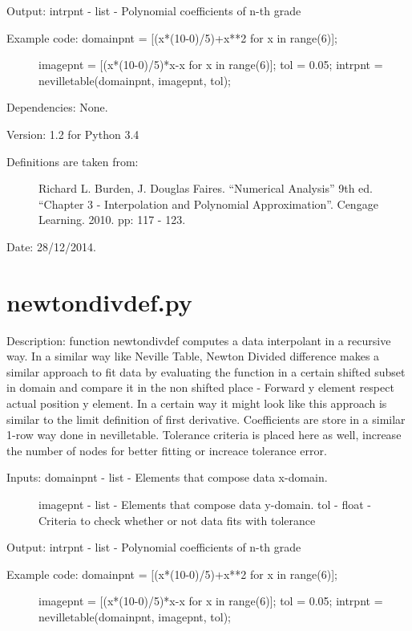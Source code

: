 \documentclass[letterpaper,10pt,oneside]{sphinxmanual}
\theoremstyle{plain}%
\theoremstyle{definition}%
\theoremstyle{remark}%
\begin{document}
Output: intrpnt - list - Polynomial coefficients of n-th grade
\begin{description}
\item[{Example code: domainpnt = {[}(x*(10-0)/5)+x**2 for x in range(6){]};}] \leavevmode
imagepnt = {[}(x*(10-0)/5)*x-x for x in range(6){]};
tol = 0.05;
intrpnt = nevilletable(domainpnt, imagepnt, tol);

\end{description}

Dependencies: None.

Version: 1.2 for Python 3.4
\begin{description}
\item[{Definitions are taken from:}] \leavevmode
Richard L. Burden, J. Douglas Faires. ``Numerical Analysis'' 9th ed.
``Chapter 3 - Interpolation and Polynomial Approximation''. 
Cengage Learning. 2010. pp: 117 - 123.

\end{description}




Date: 28/12/2014.


\section{newtondivdef.py}
\label{code:newtondivdef-py}\label{code:module-newtondivdef}
Description: function newtondivdef computes a data interpolant in a recursive
way. In a similar way like Neville Table, Newton Divided difference makes
a similar approach to fit data by evaluating the function in a certain
shifted subset in domain and compare it in the non shifted place - Forward
y element respect actual position y element. In a certain way it might look
like this approach is similar to the limit definition of first derivative.
Coefficients are store in a similar 1-row way done in nevilletable. Tolerance
criteria is placed here as well, increase the number of nodes for better 
fitting or increace tolerance error.
\begin{description}
\item[{Inputs: domainpnt - list - Elements that compose data x-domain. }] \leavevmode
imagepnt - list - Elements that compose data y-domain.
tol - float - Criteria to check whether or not data fits with tolerance

\end{description}

Output: intrpnt - list - Polynomial coefficients of n-th grade
\begin{description}
\item[{Example code: domainpnt = {[}(x*(10-0)/5)+x**2 for x in range(6){]};}] \leavevmode
imagepnt = {[}(x*(10-0)/5)*x-x for x in range(6){]};
tol = 0.05;
intrpnt = nevilletable(domainpnt, imagepnt, tol);

\end{description}
\end{document}
